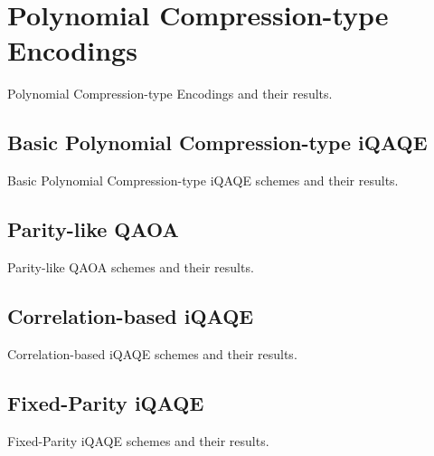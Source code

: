 \section{Polynomial Compression-type Encodings}
\label{section:Polynomial_Encodings}

Polynomial Compression-type Encodings and their results.





\subsection{Basic Polynomial Compression-type iQAQE}
\label{subsection:Basic_Poly-Comp_iQAQE}

Basic Polynomial Compression-type iQAQE schemes and their results.





\subsection{Parity-like QAOA}
\label{subsection:Parity_QAOA}

Parity-like QAOA schemes and their results.





\subsection{Correlation-based iQAQE}
\label{subsection:Correlation_iQAQE}

Correlation-based iQAQE schemes and their results.





\subsection{Fixed-Parity iQAQE}
\label{subsection:Fixed-Parity_iQAQE}

Fixed-Parity iQAQE schemes and their results.





